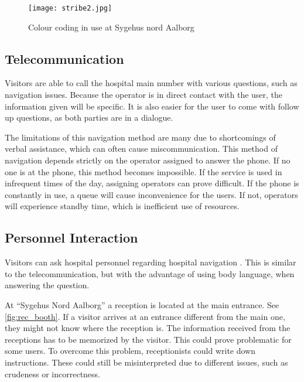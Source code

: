 \begin{figure}[htb]
  \begin{center} 
    \texttt{[image: stribe2.jpg]}
  \end{center}
  \caption{Colour coding in use at Sygehus nord Aalborg}
  \label{fig:colour_floor}
\end{figure}

\subsection{Telecommunication}\label{sub:pho}

Visitors are able to call the hospital main number with various questions, such as navigation issues\cite{sign_ring}. Because the operator is in direct contact with the user, the information given will be specific. It is also easier for the user to come with follow up questions, as both parties are in a dialogue.
 
The limitations of this navigation method are many due to shortcomings of verbal assistance, which can often cause miscommunication. This method of navigation depends strictly on the operator assigned to answer the phone. If no one is at the phone, this method becomes impossible.
If the service is used in infrequent times of the day, assigning operators can prove difficult. If the phone is constantly in use, a queue will cause inconvenience for the users. If not, operators will experience standby time, which is inefficient use of resources.

\subsection{Personnel Interaction}\label{sub:human}
Visitors can ask hospital personnel regarding hospital navigation \cite{job}. This is similar to the telecommunication, but with the advantage of using body language, when answering the question\cite{body_vs_phone}.

At \enquote{Sygehus Nord Aalborg} a reception is located at the main entrance. See \cref{fig:rec_booth}. If a visitor arrives at an entrance different from the main one, they might not know where the reception is. The information received from the receptions has to be memorized by the visitor. This could prove problematic for some users. To overcome this problem, receptionists could write down instructions. These could still be misinterpreted due to different issues, such as crudeness or incorrectness.

